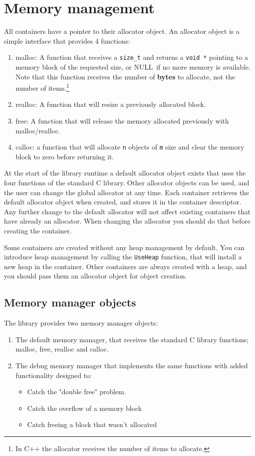 \documentclass[12pt,a4paper]{memoir} %
\newif\iftth
\newcommand{\Null}{{\iftth \ NULL \else \footnotesize NULL\  \fi}}
\begin{document}
\section{Memory management}
All containers have a pointer to their allocator object. An allocator object is a simple interface that provides 4 functions:
\begin{enumerate}
\item malloc: A function that receives a \texttt{size\_t} and returns a \texttt{void *} pointing to a memory block of the requested size, or \Null if no more memory is available. Note that this function receives the number of \textbf{bytes} to allocate, not the number of items.\footnote{In C++ the allocator receives the number of items to allocate.}
\item realloc: A function that will resize a previously allocated block.
\item free: A function that will release the memory allocated previously with malloc/realloc.
\item calloc: a function that will allocate \verb,n, objects of \verb,m, size and clear the memory block to zero before returning it. 
\end{enumerate}
At the start of the library runtime a default allocator object exists that uses the four functions of the standard C library. Other allocator objects can be used, and the user can change the global allocator at any time. Each container retrieves the default allocator object when created, and stores it in the container descriptor. Any further change to the default allocator will not affect existing containers that have already an allocator. When changing the allocator you should do that before creating the container.
 
Some containers are created without any heap management by default. You can introduce heap management by calling the \verb,UseHeap, function, that will install a new heap in the container. Other containers are always created with a heap, and you should pass them an allocator object for object creation.

\subsection{Memory manager objects}
The library provides two memory manager objects:
\begin{enumerate}
\item The default memory manager, that receives the standard C library functions; malloc, free, realloc and calloc.
\item The debug memory manager that implements the same functions with added functionality designed to:
\begin{itemize}
\item
Catch the "double free" problem.
\item
Catch the overflow of a memory block
\item
Catch freeing a block that wasn't allocated
\end{itemize}
\end{enumerate}
\end{document}
